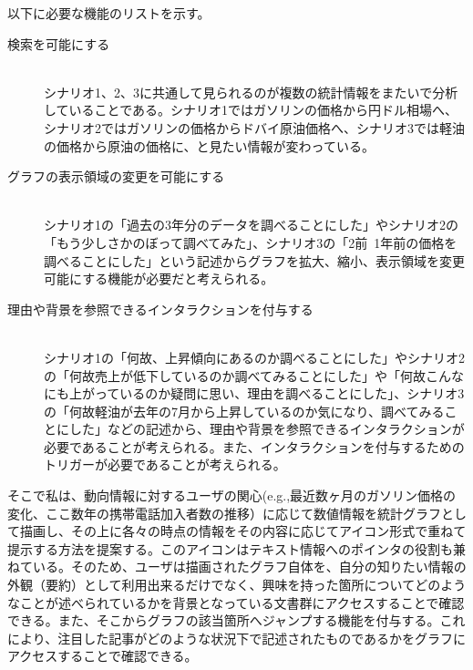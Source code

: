 \documentclass{matsushita-zemi}
\begin{document}
以下に必要な機能のリストを示す。
\begin{description}
 \item[検索を可能にする]\mbox{}\\ 
 シナリオ1、2、3に共通して見られるのが複数の統計情報をまたいで分析していることである。シナリオ1ではガソリンの価格から円ドル相場へ、シナリオ2ではガソリンの価格からドバイ原油価格へ、シナリオ3では軽油の価格から原油の価格に、と見たい情報が変わっている。
 \item[グラフの表示領域の変更を可能にする]\mbox{}\\
 シナリオ1の「過去の3年分のデータを調べることにした」やシナリオ2の「もう少しさかのぼって調べてみた」、シナリオ3の「2前~1年前の価格を調べることにした」という記述からグラフを拡大、縮小、表示領域を変更可能にする機能が必要だと考えられる。
 \item[理由や背景を参照できるインタラクションを付与する]\mbox{}\\
 シナリオ1の「何故、上昇傾向にあるのか調べることにした」やシナリオ2の「何故売上が低下しているのか調べてみることにした」や「何故こんなにも上がっているのか疑問に思い、理由を調べることにした」、シナリオ3の「何故軽油が去年の7月から上昇しているのか気になり、調べてみることにした」などの記述から、理由や背景を参照できるインタラクションが必要であることが考えられる。また、インタラクションを付与するためのトリガーが必要であることが考えられる。
\end{description}


そこで私は、動向情報に対するユーザの関心(e.g.,最近数ヶ月のガソリン価格の変化、ここ数年の携帯電話加入者数の推移）に応じて数値情報を統計グラフとして描画し、その上に各々の時点の情報をその内容に応じてアイコン形式で重ねて提示する方法を提案する。このアイコンはテキスト情報へのポインタの役割も兼ねている。そのため、ユーザは描画されたグラフ自体を、自分の知りたい情報の外観（要約）として利用出来るだけでなく、興味を持った箇所についてどのようなことが述べられているかを背景となっている文書群にアクセスすることで確認できる。また、そこからグラフの該当箇所へジャンプする機能を付与する。これにより、注目した記事がどのような状況下で記述されたものであるかをグラフにアクセスすることで確認できる。\cite{Elucignage}
\end{document}
